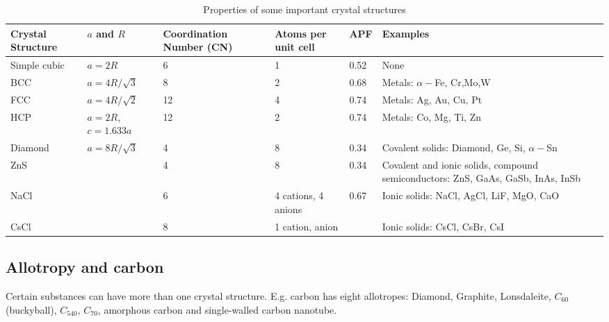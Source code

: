 \begin{table}[ht!]
    \centering
    \begin{tabularx}{0.9\linewidth}{p{2cm}p{2cm}p{2.5cm}p{1.8cm}p{1.5cm}X}
    \toprule
        Crystal Structure & $a$ and $R$ & Coordination Number (CN) & Atoms per unit cell & APF & Examples \\ \midrule
        Simple cubic & $a = 2R$ & 6 & 1 & 0.52 & None \\
        BCC & $a=4R/\sqrt{3}$ & 8 & 2 & 0.68 & Metals: $\alpha-$Fe, Cr,Mo,W \\
        FCC & $a=4R/\sqrt{2}$ & 12 & 4 & 0.74 & Metals: Ag, Au, Cu, Pt \\
        HCP & $a=2R$, $c=1.633a$ & 12 & 2 & 0.74 & Metals: Co, Mg, Ti, Zn \\
        Diamond & $a=8R/\sqrt{3}$ & 4 & 8 & 0.34 & Covalent solids: Diamond, Ge, Si, $\alpha-$Sn \\
        ZnS & & 4 & 8 & 0.34 & Covalent and ionic solids, compound semiconductors: ZnS, GaAs, GaSb, InAs, InSb \\
        NaCl & & 6 & 4 cations, 4 anions & 0.67 & Ionic solids: NaCl, AgCl, LiF, MgO, CaO \\
        CsCl & & 8 & 1 cation, \newline 1 anion & & Ionic solids: CsCl, CsBr, CsI \\
    \bottomrule
    \end{tabularx}
    \caption{Properties of some important crystal structures}
\end{table}

\subsection{Allotropy and carbon}
Certain substances can have more than one crystal structure. 
E.g. carbon has eight allotropes: Diamond, Graphite, Lonsdaleite, $C_{60}$ (buckyball), $C_{540}$, $C_{70}$, amorphous carbon and single-walled carbon nanotube.